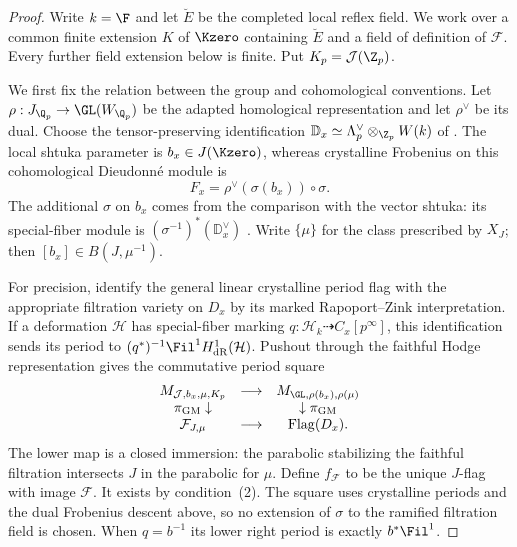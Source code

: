 \begin{proof}
Write $k=\F$ and let $\breve E$ be the completed local reflex field.
We work over a common finite extension $K$ of $\Kzero$ containing
$\breve E$ and a field of definition of $\mathcal F$.  Every further
field extension below is finite.  Put $K_p=\mathcal J(\Z_p)$.

We first fix the relation between the group and cohomological
conventions.  Let $\rho:J_{\Q_p}\to\GL(W_{\Q_p})$ be the adapted
homological representation and let $\rho^\vee$ be its dual.  Choose
the tensor-preserving identification
$\mathbb D_x\simeq\Lambda_p^\vee\otimes_{\Z_p}W(k)$ of
\cite[\S2.1.14]{KisinZhou2025}.  The local shtuka parameter is
$b_x\in J(\Kzero)$, whereas crystalline Frobenius on this
cohomological Dieudonn\'e module is
\[
 F_x=\rho^\vee(\sigma(b_x))\circ\sigma.
\]
The additional $\sigma$ on $b_x$ comes from the comparison with
the vector shtuka: its special-fiber module is
$(\sigma^{-1})^*(\mathbb D_x^\vee)$
\cite[Example~2.3.4 and Remark~2.3.10]{PappasRapoport2024}.
Write $\{\mu\}$ for the class prescribed by $X_J$; then
$[b_x]\in B(J,\mu^{-1})$.

For precision, identify the general linear crystalline period
flag with the appropriate filtration variety on $D_x$ by its
marked Rapoport--Zink interpretation.  If a deformation
$\mathcal H$ has special-fiber marking
$q:\mathcal H_k\dashrightarrow C_x[p^\infty]$, this identification
sends its period to
$(q^*)^{-1}\Fil^1H^1_{\mathrm{dR}}(\mathcal H)$.
Pushout through the faithful Hodge representation gives the
commutative period square
\[
\begin{array}{ccc}
M_{\mathcal J,b_x,\mu,K_p}&\longrightarrow&M_{\GL,\rho(b_x),\rho(\mu)}\\
\pi_{\mathrm{GM}}\downarrow&&\downarrow\pi_{\mathrm{GM}}\\
\mathcal F_{J,\mu}&\longrightarrow&\operatorname{Flag}(D_x).
\end{array}
\]
The lower map is a closed immersion: the parabolic stabilizing
the faithful filtration intersects $J$ in the parabolic for
$\mu$.  Define $f_{\mathcal F}$ to be the unique $J$-flag with
image $\mathcal F$.  It exists by condition~\textup{(2)}.  The
square uses crystalline periods and the dual Frobenius descent
above, so no extension of $\sigma$ to the ramified filtration
field is chosen.  When $q=b^{-1}$ its lower right period is
exactly $b^*\Fil^1$.


\end{proof}
